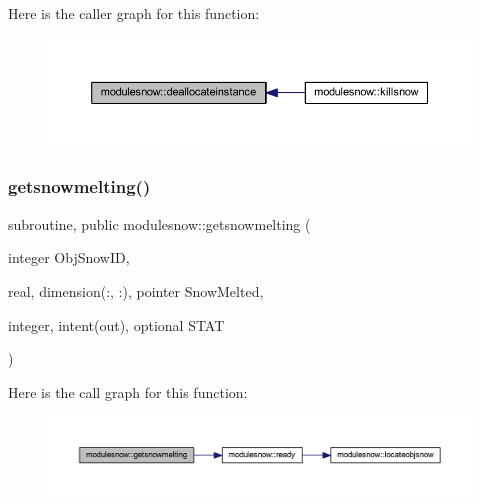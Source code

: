 Here is the caller graph for this function\+:\nopagebreak
\begin{figure}[H]
\begin{center}
\leavevmode
\includegraphics[width=350pt]{namespacemodulesnow_ac9029191079e3096a3bb36742e4d578f_icgraph}
\end{center}
\end{figure}
\mbox{\label{namespacemodulesnow_a6d79f4685f7a014eb4967e32297c5f09}} 
\subsubsection{\texorpdfstring{getsnowmelting()}{getsnowmelting()}}
{\footnotesize\ttfamily subroutine, public modulesnow\+::getsnowmelting (\begin{DoxyParamCaption}\item[{integer}]{Obj\+Snow\+ID,  }\item[{real, dimension(\+:, \+:), pointer}]{Snow\+Melted,  }\item[{integer, intent(out), optional}]{S\+T\+AT }\end{DoxyParamCaption})}

Here is the call graph for this function\+:\nopagebreak
\begin{figure}[H]
\begin{center}
\leavevmode
\includegraphics[width=350pt]{namespacemodulesnow_a6d79f4685f7a014eb4967e32297c5f09_cgraph}
\end{center}
\end{figure}
\mbox{\label{namespacemodulesnow_a9e1c37918173cd2c259cbdae24b7e9bc}} 
